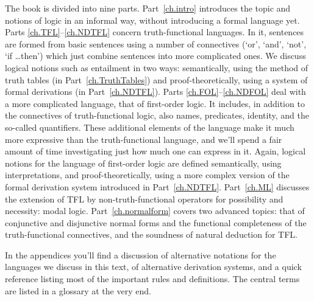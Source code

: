 The book is divided into nine parts. Part~\ref{ch.intro} introduces the topic and notions of logic in an informal way, without introducing a formal language yet.  Parts \ref{ch.TFL}--\ref{ch.NDTFL} concern truth-functional languages. In it, sentences are formed from basic sentences using a number of connectives (`or', `and', `not', `if \dots then') which just combine sentences into more complicated ones.  We discuss logical notions such as entailment in two ways: semantically, using the method of truth tables (in Part~\ref{ch.TruthTables}) and proof-theoretically, using a system of formal derivations (in Part~\ref{ch.NDTFL}).  Parts \ref{ch.FOL}--\ref{ch.NDFOL} deal with a more complicated language, that of first-order logic. It includes, in addition to the connectives of truth-functional logic, also names, predicates, identity, and the so-called quantifiers. These additional elements of the language make it much more expressive than the truth-functional language, and we'll spend a fair amount of time investigating just how much one can express in it.  Again, logical notions for the language of first-order logic are defined semantically, using interpretations, and proof-theoretically, using a more complex version of the formal derivation system introduced in Part~\ref{ch.NDTFL}.  Part~\ref{ch.ML} discusses the extension of TFL by non-truth-functional operators for possibility and necessity: modal logic. Part~\ref{ch.normalform} covers two advanced topics: that of conjunctive and disjunctive normal forms and the functional completeness of the truth-functional connectives, and the soundness of natural deduction for TFL.

In the appendices you'll find a discussion of alternative notations for the languages we discuss in this text, of alternative derivation systems, and a quick reference listing most of the important rules and definitions. The central terms are listed in a glossary at the very end.

